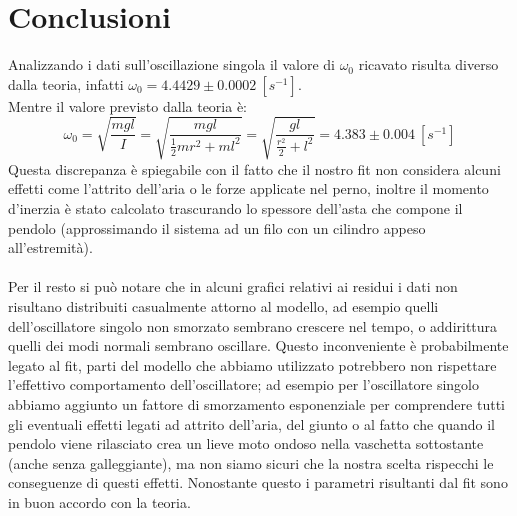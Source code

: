 \documentclass{article}
\begin{document}
	\section{Conclusioni}
	Analizzando i dati sull'oscillazione singola il valore di $\omega_0$ ricavato risulta diverso dalla teoria, infatti
	$\omega_0 = 4.4429 \pm 0.0002 \:[s^{-1}]$.\\
	Mentre il valore previsto dalla teoria \`{e}:
	\begin{equation*}
		\omega_0 = \sqrt{\frac{mgl}{I}} = \sqrt{\dfrac{mgl}{\frac{1}{2}mr^2 + ml^2}} =\sqrt{\dfrac{gl}{\frac{r^2}{2} + l^2}} = 4.383 \pm 0.004 \:[s^{-1}]
	\end{equation*}
	Questa discrepanza \`{e} spiegabile con il fatto che il nostro fit non considera alcuni effetti come l'attrito dell'aria o le forze applicate nel perno, inoltre il momento d'inerzia \`{e} stato calcolato trascurando lo spessore dell'asta che compone il pendolo (approssimando il sistema ad un filo con un cilindro appeso all'estremit\`{a}).\\\\
	Per il resto si pu\`{o} notare che in alcuni grafici relativi ai residui i dati non risultano distribuiti casualmente attorno al modello, ad esempio quelli dell'oscillatore singolo non smorzato sembrano crescere nel tempo, o addirittura quelli dei modi normali sembrano oscillare. Questo inconveniente \`{e} probabilmente legato al fit, parti del modello che abbiamo utilizzato potrebbero non rispettare l'effettivo comportamento dell'oscillatore; ad esempio per l'oscillatore singolo abbiamo aggiunto un fattore di smorzamento esponenziale per comprendere tutti gli eventuali effetti legati ad attrito dell'aria, del giunto o al fatto che quando il pendolo viene rilasciato crea un lieve moto ondoso nella vaschetta sottostante (anche senza galleggiante), ma non siamo sicuri che la nostra scelta rispecchi le conseguenze di questi effetti.
	Nonostante questo i parametri risultanti dal fit sono in buon accordo con la teoria.
\end{document}
